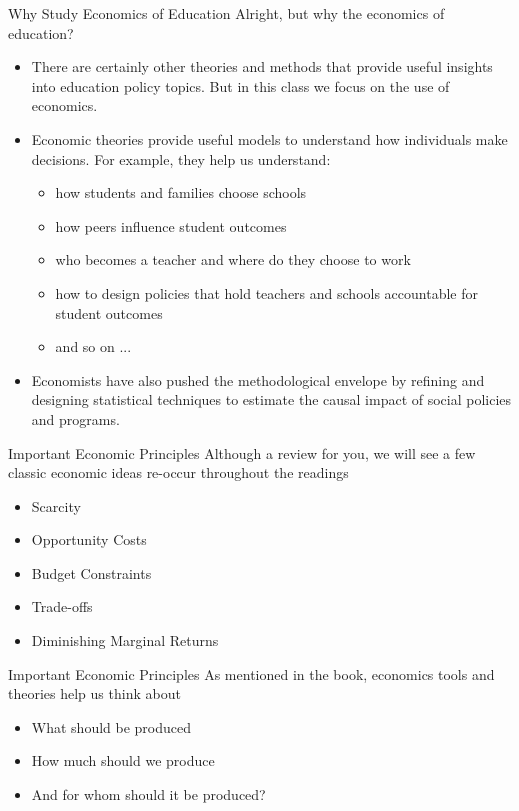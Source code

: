 \documentclass{beamer}
\begin{document}
\begin{frame}{Why Study Economics of Education}
Alright, but why the economics of education?    
    \begin{itemize}
        \item There are certainly other theories and methods that provide useful insights into education policy topics. But in this class we focus on the use of economics. 
        \item Economic theories provide useful models to understand how individuals make decisions. For example, they help us understand: 
        \begin{itemize}
            \item how students and families choose schools
            \item how peers influence student outcomes
            \item who becomes a teacher and where do they choose to work
            \item how to design policies that hold teachers and schools accountable for student outcomes
            \item and so on ...
        \end{itemize}
        \item Economists have also pushed the methodological envelope by refining and designing statistical techniques to estimate the causal impact of social policies and programs.
    \end{itemize}
\end{frame}
\begin{frame}{Important Economic Principles}
Although a review for you, we will see a few classic economic ideas re-occur throughout the readings
    \begin{itemize}
        \item Scarcity
        \item Opportunity Costs
        \item Budget Constraints
        \item Trade-offs
        \item Diminishing Marginal Returns
    \end{itemize}
\end{frame}

\begin{frame}{Important Economic Principles}
As mentioned in the book, economics tools and theories help us think about
    \begin{itemize}
        \item What should be produced
        \item How much should we produce
        \item And for whom should it be produced?
    \end{itemize}
\end{frame}    
\end{document}
